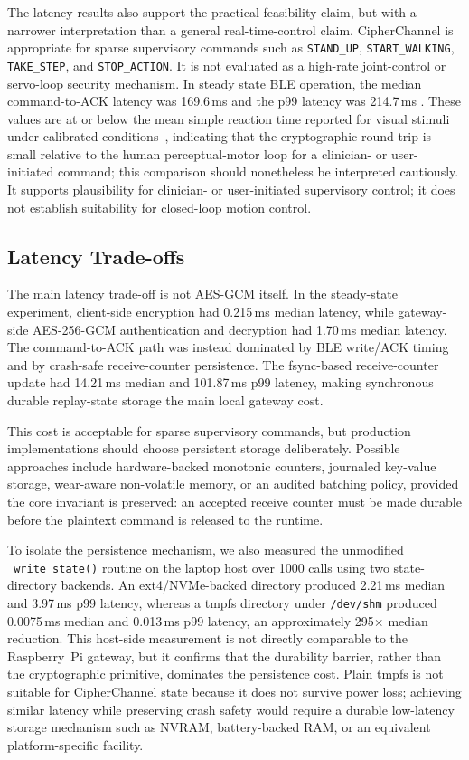 \documentclass[journal]{IEEEtran}
\begin{document}
The latency results also support the practical feasibility claim, but with a narrower interpretation than a general real-time-control claim. CipherChannel is appropriate for sparse supervisory commands such as \texttt{STAND\_UP}, \texttt{START\_WALKING}, \texttt{TAKE\_STEP}, and \texttt{STOP\_ACTION}. It is not evaluated as a high-rate joint-control or servo-loop security mechanism. In steady state BLE operation, the median command-to-ACK latency was 169.6\,ms  and the p99 latency was 214.7\,ms . These values are at or below the mean simple reaction time reported for visual stimuli under calibrated conditions~\cite{woods2015reaction}, indicating that the cryptographic round-trip is small relative to the human perceptual-motor loop for a clinician- or user-initiated command; this comparison should nonetheless be interpreted cautiously. It supports plausibility for clinician- or user-initiated supervisory control; it does not establish suitability for closed-loop motion control.

\subsection{Latency Trade-offs}

The main latency trade-off is not AES-GCM itself. In the steady-state experiment, client-side encryption had 0.215\,ms median latency, while gateway-side AES-256-GCM authentication and decryption had 1.70\,ms median latency. The command-to-ACK path was instead dominated by BLE write/ACK timing and by crash-safe receive-counter persistence. The fsync-based receive-counter update had 14.21\,ms median and 101.87\,ms p99 latency, making synchronous durable replay-state storage the main local gateway cost.

This cost is acceptable for sparse supervisory commands, but production implementations should choose persistent storage deliberately. Possible approaches include hardware-backed monotonic counters, journaled key-value storage, wear-aware non-volatile memory, or an audited batching policy, provided the core invariant is preserved: an accepted receive counter must be made durable before the plaintext command is released to the runtime.

To isolate the persistence mechanism, we also measured the unmodified \texttt{\_write\_state()} routine on the laptop host over 1000 calls using two state-directory backends. An ext4/NVMe-backed directory produced 2.21\,ms median and 3.97\,ms p99 latency, whereas a tmpfs directory under \texttt{/dev/shm} produced 0.0075\,ms median and 0.013\,ms p99 latency, an approximately 295$\times$ median reduction. This host-side measurement is not directly comparable to the Raspberry~Pi gateway, but it confirms that the durability barrier, rather than the cryptographic primitive, dominates the persistence cost. Plain tmpfs is not suitable for CipherChannel state because it does not survive power loss; achieving similar latency while preserving crash safety would require a durable low-latency storage mechanism such as NVRAM, battery-backed RAM, or an equivalent platform-specific facility.
\end{document}

